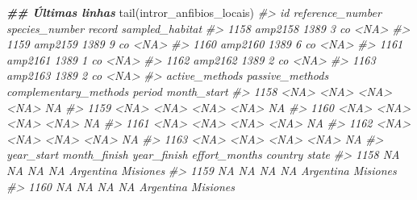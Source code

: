 \documentclass[
]{book}
\newenvironment{Shaded}{\begin{snugshade}}{\end{snugshade}}
\newcommand{\CommentTok}[1]{\textcolor[rgb]{0.37,0.37,0.37}{\textit{#1}}}
\newcommand{\DocumentationTok}[1]{\textcolor[rgb]{0.37,0.37,0.37}{\textbf{\textit{#1}}}}
\newcommand{\FunctionTok}[1]{\textcolor[rgb]{0,0,0}{#1}}
\newcommand{\NormalTok}[1]{#1}
\begin{document}
\begin{Shaded}
\begin{Highlighting}[]
\DocumentationTok{\#\# Últimas linhas}
\FunctionTok{tail}\NormalTok{(intror\_anfibios\_locais)}
\CommentTok{\#\textgreater{}           id reference\_number species\_number record sampled\_habitat}
\CommentTok{\#\textgreater{} 1158 amp2158             1389              3     co            \textless{}NA\textgreater{}}
\CommentTok{\#\textgreater{} 1159 amp2159             1389              9     co            \textless{}NA\textgreater{}}
\CommentTok{\#\textgreater{} 1160 amp2160             1389              6     co            \textless{}NA\textgreater{}}
\CommentTok{\#\textgreater{} 1161 amp2161             1389              1     co            \textless{}NA\textgreater{}}
\CommentTok{\#\textgreater{} 1162 amp2162             1389              2     co            \textless{}NA\textgreater{}}
\CommentTok{\#\textgreater{} 1163 amp2163             1389              2     co            \textless{}NA\textgreater{}}
\CommentTok{\#\textgreater{}      active\_methods passive\_methods complementary\_methods period month\_start}
\CommentTok{\#\textgreater{} 1158           \textless{}NA\textgreater{}            \textless{}NA\textgreater{}                  \textless{}NA\textgreater{}   \textless{}NA\textgreater{}          NA}
\CommentTok{\#\textgreater{} 1159           \textless{}NA\textgreater{}            \textless{}NA\textgreater{}                  \textless{}NA\textgreater{}   \textless{}NA\textgreater{}          NA}
\CommentTok{\#\textgreater{} 1160           \textless{}NA\textgreater{}            \textless{}NA\textgreater{}                  \textless{}NA\textgreater{}   \textless{}NA\textgreater{}          NA}
\CommentTok{\#\textgreater{} 1161           \textless{}NA\textgreater{}            \textless{}NA\textgreater{}                  \textless{}NA\textgreater{}   \textless{}NA\textgreater{}          NA}
\CommentTok{\#\textgreater{} 1162           \textless{}NA\textgreater{}            \textless{}NA\textgreater{}                  \textless{}NA\textgreater{}   \textless{}NA\textgreater{}          NA}
\CommentTok{\#\textgreater{} 1163           \textless{}NA\textgreater{}            \textless{}NA\textgreater{}                  \textless{}NA\textgreater{}   \textless{}NA\textgreater{}          NA}
\CommentTok{\#\textgreater{}      year\_start month\_finish year\_finish effort\_months   country    state}
\CommentTok{\#\textgreater{} 1158         NA           NA          NA            NA Argentina Misiones}
\CommentTok{\#\textgreater{} 1159         NA           NA          NA            NA Argentina Misiones}
\CommentTok{\#\textgreater{} 1160         NA           NA          NA            NA Argentina Misiones}

\end{Highlighting}
\end{Shaded}
\end{document}
